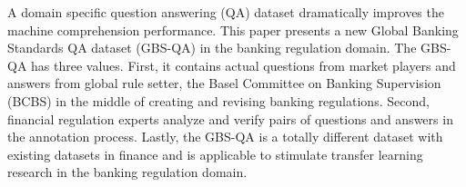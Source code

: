 A domain specific question answering (QA) dataset dramatically improves the machine comprehension performance. This paper presents a new Global Banking Standards QA dataset (GBS-QA) in the banking regulation domain. The GBS-QA has three values. First, it contains actual questions from market players and answers from global rule setter, the Basel Committee on Banking Supervision (BCBS) in the middle of creating and revising banking regulations. Second, financial regulation experts analyze and verify pairs of questions and answers in the annotation process. Lastly, the GBS-QA is a totally different dataset with existing datasets in finance and is applicable to stimulate transfer learning research in the banking regulation domain.
